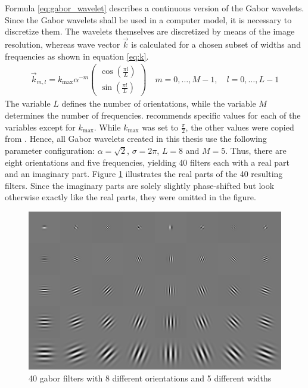 \documentclass[11pt, a4paper]{article}
\begin{document}
Formula \eqref{eq:gabor_wavelet} describes a continuous version of the Gabor wavelets. Since the Gabor wavelets shall be used in a computer model, it is necessary to discretize them. The wavelets themselves are discretized by means of the image resolution, whereas wave vector $\vec{k}$ is calculated for a chosen subset of widths and frequencies as shown in equation \eqref{eq:k}. 
\begin{align}
\label{eq:k}
\vec{k}_{m,l} = k_\text{max} \alpha^{-m} \begin{pmatrix}\cos\left(\frac{\pi l}{L}\right)\\ \sin\left(\frac{\pi l}{L}\right)\end{pmatrix} \quad m = 0, \ldots, M - 1, \quad l = 0, \ldots, L-1
\end{align}
The variable $L$ defines the number of orientations, while the variable $M$ determines the number of frequencies. \cite{ebgm} recommends specific values for each of the variables except for $k_\text{max}$. While $k_\text{max}$ was set to $\frac{\pi}{2}$, the other values were copied from \cite{ebgm}. Hence, all Gabor wavelets created in this thesis use the following parameter configuration: $\alpha = \sqrt{2}$, $\sigma = 2\pi$, $L = 8$ and $M = 5$. Thus, there are eight orientations and five frequencies, yielding 40 filters each with a real part and an imaginary part. Figure \ref{fig:gabor_filters} illustrates the real parts of the 40 resulting filters. Since the imaginary parts are solely slightly phase-shifted but look otherwise  exactly like the real parts, they were omitted in the figure.
\begin{figure}[htbp]
	\centering
	\includegraphics[width=\textwidth]{gabor_filters_normalized_filterwise_real.png}
	\caption{40 gabor filters with 8 different orientations and 5 different widths}
	\label{fig:gabor_filters}
\end{figure}\\
\end{document}
